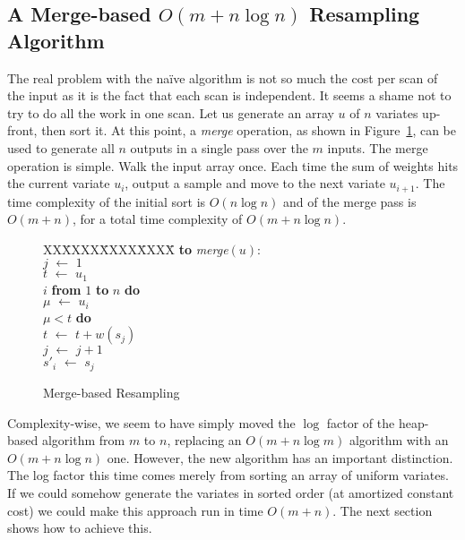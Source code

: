 \documentclass{article}
\newcommand{\asgn}{\,\,\leftarrow\,\,}
\begin{document}
\subsection{A Merge-based $O(m + n \log n)$ Resampling Algorithm}\label{sec:merge}

  The real problem with the na\"ive
  algorithm is not so much the cost per scan of the input as it is the
  fact that each scan is independent.  It seems a shame not
  to try to do all the work in one scan.
  Let us generate an array $u$ of $n$ variates up-front,
  then sort it.  At this point, a {\em merge} operation, as
  shown in Figure~\ref{fig:merge}, can be used to generate
  all $n$ outputs in a single pass over the $m$ inputs.  The
  merge operation is simple.  Walk the input array once.
  Each time the sum of weights hits the current variate
  $u_i$, output a sample and move to the next variate
  $u_{i+1}$.  The time complexity of the initial sort is
  $O(n \log n)$ and of the merge pass is $O(m + n)$, for a
  total time complexity of $O(m + n \log n)$.

  \begin{figure}
    \centering
    \begin{minipage}[b]{\linewidth}
      \begin{tabbing}
      XX\=XXXX\=XXXX\=XXXX\=\kill
      {\bf to} {\it merge}$(u)$: \\
      \>$j \asgn 1$ \\
      \>$t \asgn u_1$ \\
       $i$ {\bf from} $1$ {\bf to} $n$ {\bf do} \\
      \>\>$\mu \asgn u_i$ \\
      \> $\mu < t$ {\bf do} \\
      \>\>\>$t \asgn t + w(s_j)$ \\
      \>\>\>$j \asgn j + 1$ \\
      \>\>$s'_i \asgn s_j$
    \end{tabbing}
    \end{minipage}
    \caption{Merge-based Resampling}\label{fig:merge}
  \end{figure}

  Complexity-wise, we seem to have simply moved the $\log$
  factor of the heap-based algorithm from $m$ to $n$,
  replacing an $O(m + n \log m)$ algorithm with an $O(m + n
  \log n)$ one.  However, the new algorithm has an important
  distinction.  The log factor this time comes merely from
  sorting an array of uniform variates.  If we could somehow
  generate the variates in sorted order (at amortized
  constant cost) we could make this approach run in time
  $O(m + n)$.  The next section shows how to achieve this.
\end{document}
